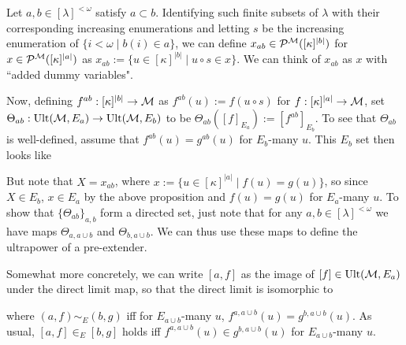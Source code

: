 \qquad Let $a,b\in[\lambda]^{<\omega}$ satisfy $a\subset b$. Identifying such finite subsets of $\lambda$ with their corresponding increasing enumerations and letting $s$ be the increasing enumeration of $\{i<\omega\mid b(i)\in a\}$, we can define $x_{ab}\in\mathcal P^{\operatorname{\mathcal{M}}}([\kappa]^{|b|})$ for $x\in\mathcal P^{\operatorname{\mathcal{M}}}([\kappa]^{|a|})$ as $x_{ab}:=\{u\in[\kappa]^{|b|}\mid u\circ s\in x\}$. We can think of $x_{ab}$ as $x$ with ``added dummy variables".


Now, defining $f^{ab}:[\kappa]^{|b|}\to\operatorname{\mathcal{M}}$ as $f^{ab}(u):=f(u\circ s)$ for $f:[\kappa]^{|a|}\to\operatorname{\mathcal{M}}$, set $\Theta_{ab}:\operatorname{Ult}(\operatorname{\mathcal{M}},E_a)\to\operatorname{Ult}(\operatorname{\mathcal{M}},E_b)$ to be $\Theta_{ab}([f]_{E_a}):=[f^{ab}]_{E_b}$. To see that $\Theta_{ab}$ is well-defined, assume that $f^{ab}(u)=g^{ab}(u)$ for $E_b$-many $u$. This $E_b$ set then looks like

But note that $X=x_{ab}$, where $x:=\{u\in[\kappa]^{|a|}\mid f(u)=g(u)\}$, so since $X\in E_b$, $x\in E_a$ by the above proposition and $f(u)=g(u)$ for $E_a$-many $u$. To show that $\{\Theta_{ab}\}_{a,b}$ form a directed set, just note that for any $a,b\in[\lambda]^{<\omega}$ we have maps $\Theta_{a,a\cup b}$ and $\Theta_{b,a\cup b}$. We can thus use these maps to define the ultrapower of a pre-extender.


Somewhat more concretely, we can write $[a,f]$ as the image of $[f]\in\operatorname{Ult}(\operatorname{\mathcal{M}},E_a)$ under the direct limit map, so that the direct limit is isomorphic to

where $(a,f)\sim_E (b,g)$ iff for $E_{a\cup b}$-many $u$, $f^{a,a\cup b}(u)=g^{b,a\cup b}(u)$. As usual, $[a,f]\in_E[b,g]$ holds iff $f^{a,a\cup b}(u)\in g^{b,a\cup b}(u)$ for $E_{a\cup b}$-many $u$.

